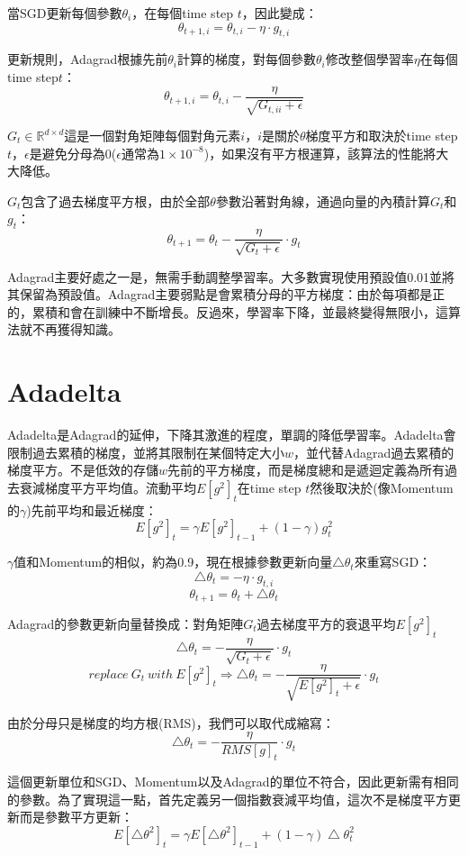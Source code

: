 \documentclass[13pt, a4paper]{report}
\begin{document}
當SGD更新每個參數$\theta_i$，在每個time step $t$，因此變成：
$$\theta_{t+1,i}=\theta_{t,i}-\eta\cdot g_{t,i}$$

更新規則，Adagrad根據先前$\theta_i$計算的梯度，對每個參數$\theta_i$修改整個學習率$\eta$在每個time step$t$：
$$\theta_{t+1,i}=\theta_{t,i}-\frac{\eta}{\sqrt{G_{t,ii}+\epsilon}}$$

$G_t \in \mathbb{R}^{d\times d}$這是一個對角矩陣每個對角元素$i$，$i$是關於$\theta$梯度平方和取決於time step$t$，$\epsilon$是避免分母為0($\epsilon$通常為$1\times10^{-8}$)，如果沒有平方根運算，該算法的性能將大大降低。

$G_t$包含了過去梯度平方根，由於全部$\theta$參數沿著對角線，通過向量的內積計算$G_t$和$g_t$：
$$\theta_{t+1}=\theta_{t}-\frac{\eta}{\sqrt{G_{t}+\epsilon}}\cdot g_t$$

Adagrad主要好處之一是，無需手動調整學習率。大多數實現使用預設值0.01並將其保留為預設值。Adagrad主要弱點是會累積分母的平方梯度：由於每項都是正的，累積和會在訓練中不斷增長。反過來，學習率下降，並最終變得無限小，這算法就不再獲得知識。
\section{Adadelta}
Adadelta是Adagrad的延伸，下降其激進的程度，單調的降低學習率。Adadelta會限制過去累積的梯度，並將其限制在某個特定大小$w$，並代替Adagrad過去累積的梯度平方。不是低效的存儲$w$先前的平方梯度，而是梯度總和是遞迴定義為所有過去衰減梯度平方平均值。流動平均$E[g^2]_t$在time step $t$然後取決於(像Momentum的$\gamma$)先前平均和最近梯度：
$$E[g^2]_t=\gamma E[g^2]_{t-1}+(1-\gamma)g^2 _t$$

$\gamma$值和Momentum的相似，約為0.9，現在根據參數更新向量$\bigtriangleup\theta_t$來重寫SGD：
$$\bigtriangleup\theta_t=-\eta\cdot g_{t,i}$$
$$\theta_{t+1}=\theta_t+\bigtriangleup\theta_t$$

Adagrad的參數更新向量替換成：對角矩陣$G_t$過去梯度平方的衰退平均$E[g^2]_t$
$$\bigtriangleup\theta_t=-\frac{\eta}{\sqrt{G_t+\epsilon}}\cdot g_t$$
$$replace\ G_t\ with\ E[g^2]_t\Rightarrow\bigtriangleup\theta_t=-\frac{\eta}{\sqrt{E[g^2]_t+\epsilon}}\cdot g_t$$

由於分母只是梯度的均方根(RMS)，我們可以取代成縮寫：
$$\bigtriangleup\theta_t=-\frac{\eta}{RMS[g]_t}\cdot g_t$$

這個更新單位和SGD、Momentum以及Adagrad的單位不符合，因此更新需有相同的參數。為了實現這一點，首先定義另一個指數衰減平均值，這次不是梯度平方更新而是參數平方更新：
$$E[\bigtriangleup\theta^2]_t=\gamma E[\bigtriangleup\theta^2]_{t-1}+(1-\gamma)\bigtriangleup\theta^2 _t$$
\end{document}
